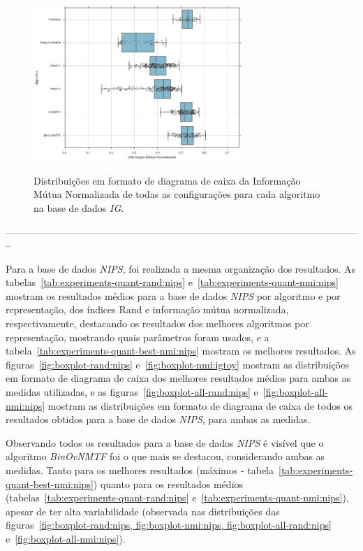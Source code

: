 \documentclass[
    12pt,                %
    oneside,            %
    a4paper,            %
    english,            %
    brazil                %
    ]{abntex2ppgsi}
\begin{document}
\begin{figure}[H]
    \centering
    \caption{Distribuições em formato de diagrama de caixa da Informação Mútua Normalizada de todas as configurações para cada algoritmo na base de dados \textit{IG}.}
    \includegraphics[width=0.7\textwidth]{img/boxplot-all-nmi-ig.png}
    \label{fig:boxplot-all-nmi:ig}
\end{figure}

--------------------------------------------------------------------------------------------------------------

Para a base de dados \textit{NIPS}, foi realizada a mesma organização dos resultados.
As tabelas~\ref{tab:experiments-quant-rand:nips} e~\ref{tab:experiments-quant-nmi:nips} mostram os resultados médios para a base de dados \textit{NIPS} por algoritmo e por representação, dos índices Rand e informação mútua normalizada, respectivamente, destacando os resultados dos melhores algoritmos por representação, mostrando quais parâmetros foram usados, e a tabela~\ref{tab:experiments-quant-best-nmi:nips} mostram os melhores resultados.
As figuras~\ref{fig:boxplot-rand:nips} e~\ref{fig:boxplot-nmi:igtoy} mostram as distribuições em formato de diagrama de caixa dos melhores resultados médios para ambas as medidas utilizadas, e as figuras~\ref{fig:boxplot-all-rand:nips} e~\ref{fig:boxplot-all-nmi:nips} mostram as distribuições em formato de diagrama de caixa de todos os resultados obtidos para a base de dados \textit{NIPS}, para ambas as medidas.

Observando todos os resultados para a base de dados \textit{NIPS} é visível que o algoritmo \textit{BinOvNMTF} foi o que mais se destacou, considerando ambas as medidas.
Tanto para os melhores resultados (máximos - tabela~\ref{tab:experiments-quant-best-nmi:nips}) quanto para os resultados médios (tabelas~\ref{tab:experiments-quant-rand:nips} e~\ref{tab:experiments-quant-nmi:nips}), apesar de ter alta variabilidade (observada nas distribuições das figuras~\ref{fig:boxplot-rand:nips, fig:boxplot-nmi:nips, fig:boxplot-all-rand:nips} e~\ref{fig:boxplot-all-nmi:nips}).
\end{document}
